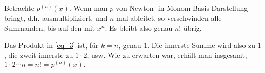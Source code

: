 \begin{remark}

Betrachte $p^{(n)}(x)$.
Wenn man $p$ von Newton- in Monom-Basis-Darstellung bringt, d.h. ausmultipliziert, und $n$-mal ableitet, so verschwinden alle Summanden, bis auf den mit $x^n$.
Es bleibt also genau $n!$ übrig.

Das Produkt in \eqref{eq_3} ist, für $k = n$, genau $1$.
Die innerste Summe wird also zu $1$, die zweit-innerste zu $1 \cdot 2$, usw.
Wie zu erwarten war, erhält man insgesamt, $1 \cdot 2 \cdots n = n! = p^{(n)}(x).$

\end{remark}
